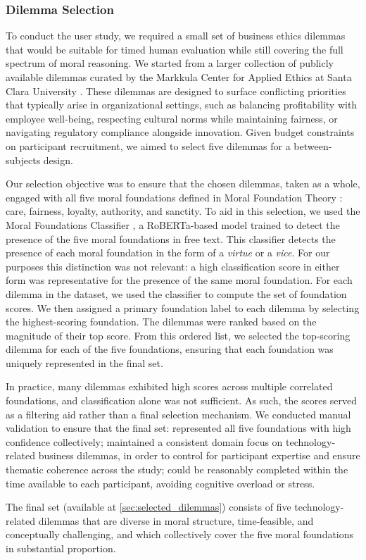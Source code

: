 \subsubsection{Dilemma Selection}
\label{sec:dilemmas}

To conduct the user study, we required a small set of business ethics dilemmas that would be suitable for timed human evaluation while still covering the full spectrum of moral reasoning. We started from a larger collection of publicly available dilemmas curated by the Markkula Center for Applied Ethics at Santa Clara University \cite{scu_business,scu_engineering}.
These dilemmas are designed to surface conflicting priorities that typically arise in organizational settings, such as balancing profitability with employee well-being, respecting cultural norms while maintaining fairness, or navigating regulatory compliance alongside innovation.
Given budget constraints on participant recruitment, we aimed to select five dilemmas for a between-subjects design.

Our selection objective was to ensure that the chosen dilemmas, taken as a whole, engaged with all five moral foundations defined in Moral Foundation Theory \cite{GRAHAM201355}: care, fairness, loyalty, authority, and sanctity. To aid in this selection, we used the Moral Foundations Classifier \cite{ardag2024moral}, a RoBERTa-based model trained to detect the presence of the five moral foundations in free text.
This classifier detects the presence of each moral foundation in the form of a \textit{virtue} or a \textit{vice}. For our purposes this distinction was not relevant: a high classification score in either form was representative for the presence of the same moral foundation.
For each dilemma in the dataset, we used the classifier to compute the set of foundation scores. We then assigned a primary foundation label to each dilemma by selecting the highest-scoring foundation. The dilemmas were ranked based on the magnitude of their top score. From this ordered list, we selected the top-scoring dilemma for each of the five foundations, ensuring that each foundation was uniquely represented in the final set.

In practice, many dilemmas exhibited high scores across multiple correlated foundations, and classification alone was not sufficient. As such, the scores served as a filtering aid rather than a final selection mechanism.
We conducted manual validation to ensure that the final set:
represented all five foundations with high confidence collectively;
maintained a consistent domain focus on technology-related business dilemmas, in order to control for participant expertise and ensure thematic coherence across the study;
could be reasonably completed within the time available to each participant, avoiding cognitive overload or stress.

The final set (available at \ref{sec:selected_dilemmas}) consists of five technology-related dilemmas that are diverse in moral structure, time-feasible, and conceptually challenging, and which collectively cover the five moral foundations in substantial proportion.
